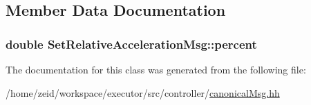 \subsection{Member Data Documentation}
\hypertarget{class_set_relative_acceleration_msg_aef5826b5691c594b8180746f3983cabb}{
\subsubsection[{percent}]{\setlength{\rightskip}{0pt plus 5cm}double {\bf SetRelativeAccelerationMsg::percent}}}
\label{class_set_relative_acceleration_msg_aef5826b5691c594b8180746f3983cabb}


The documentation for this class was generated from the following file:\begin{DoxyCompactItemize}
\item 
/home/zeid/workspace/executor/src/controller/\hyperlink{canonical_msg_8hh}{canonicalMsg.hh}\end{DoxyCompactItemize}
